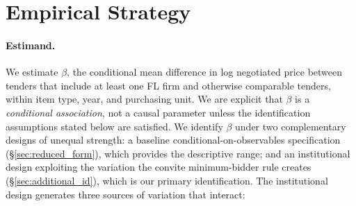 

\section{Empirical Strategy}
\label{sec:empirical}

\paragraph{Estimand.}
We estimate $\beta$, the conditional mean difference in log
negotiated price between tenders that include at least one FL
firm and otherwise comparable tenders, within item type, year,
and purchasing unit. We are explicit that $\beta$ is a
\emph{conditional association}, not a causal parameter unless
the identification assumptions stated below are satisfied. We
identify $\beta$ under two complementary designs of unequal
strength: a baseline conditional-on-observables specification
(\S\ref{sec:reduced_form}), which provides the descriptive
range; and an institutional design exploiting the variation
the convite minimum-bidder rule creates
(\S\ref{sec:additional_id}), which is our primary
identification. The institutional design generates three
sources of variation that interact:

